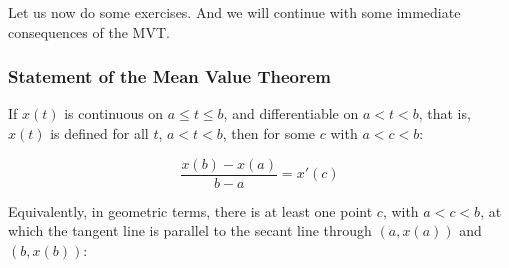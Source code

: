 \documentclass[pdftex, brazil, 12pt, twoside]{article}
\begin{document}
Let us now do some exercises.
And we will continue with some immediate consequences
of the MVT.

\subsubsection{Statement of the Mean Value Theorem}
\label{u1-mvt-statement}

If $x(t)$ is continuous on $a \le t \le b$, and differentiable on $a < t < b$, that
is, $x(t)$ is defined for all $t$, $a < t < b$, then for some $c$ with $a < c < b$:

\begin{equation}
  \frac{x(b) - x(a)}{b - a} = x'(c)
\end{equation}

Equivalently, in geometric terms, there is at least one point $c$, with $a < c < b$,
at which the tangent line is parallel to the secant line through $(a, x(a))$ and
$(b, x(b))$:

\begin{figure}[H]
  \begin{center}
    \label{fig:mvt-stat-1}
  \end{center}
\end{figure}
\end{document}
